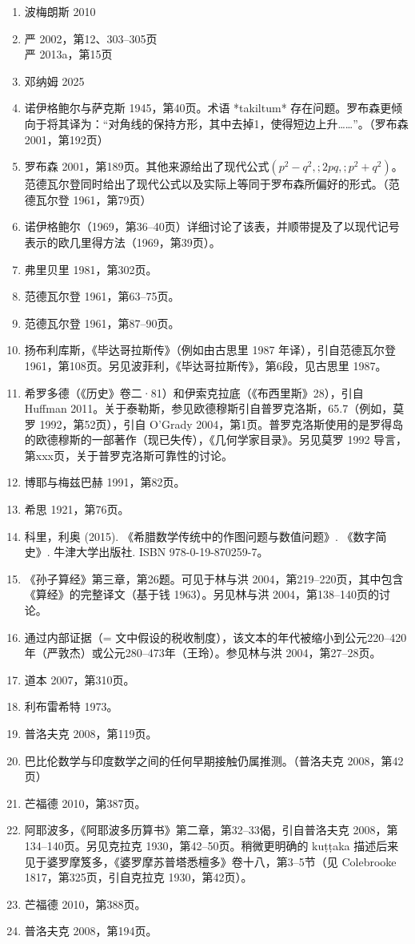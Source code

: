\begin{enumerate}
\item 波梅朗斯 2010
\item 严 2002，第12、303–305页\\
严 2013a，第15页
\item 邓纳姆 2025
\item 诺伊格鲍尔与萨克斯 1945，第40页。术语 *takiltum* 存在问题。罗布森更倾向于将其译为：“对角线的保持方形，其中去掉1，使得短边上升……”。（罗布森 2001，第192页）
\item 罗布森 2001，第189页。其他来源给出了现代公式$(p^{2}-q^{2}, ; 2pq, ; p^{2}+q^{2})$。范德瓦尔登同时给出了现代公式以及实际上等同于罗布森所偏好的形式。（范德瓦尔登 1961，第79页）
\item 诺伊格鲍尔（1969，第36–40页）详细讨论了该表，并顺带提及了以现代记号表示的欧几里得方法（1969，第39页）。
\item 弗里贝里 1981，第302页。
\item 范德瓦尔登 1961，第63–75页。
\item 范德瓦尔登 1961，第87–90页。
\item 扬布利库斯，《毕达哥拉斯传》（例如由古思里 1987 年译），引自范德瓦尔登 1961，第108页。另见波菲利，《毕达哥拉斯传》，第6段，见古思里 1987。
\item 希罗多德（《历史》卷二·81）和伊索克拉底（《布西里斯》28），引自 Huffman 2011。关于泰勒斯，参见欧德穆斯引自普罗克洛斯，65.7（例如，莫罗 1992，第52页），引自 O'Grady 2004，第1页。普罗克洛斯使用的是罗得岛的欧德穆斯的一部著作（现已失传），《几何学家目录》。另见莫罗 1992 导言，第xxx页，关于普罗克洛斯可靠性的讨论。
\item 博耶与梅兹巴赫 1991，第82页。
\item 希思 1921，第76页。
\item 科里，利奥 (2015). 《希腊数学传统中的作图问题与数值问题》. 《数字简史》. 牛津大学出版社. ISBN 978-0-19-870259-7。
\item 《孙子算经》第三章，第26题。可见于林与洪 2004，第219–220页，其中包含《算经》的完整译文（基于钱 1963）。另见林与洪 2004，第138–140页的讨论。
\item 通过内部证据（= 文中假设的税收制度），该文本的年代被缩小到公元220–420年（严敦杰）或公元280–473年（王玲）。参见林与洪 2004，第27–28页。
\item 道本 2007，第310页。
\item 利布雷希特 1973。
\item 普洛夫克 2008，第119页。
\item 巴比伦数学与印度数学之间的任何早期接触仍属推测。（普洛夫克 2008，第42页）
\item 芒福德 2010，第387页。
\item 阿耶波多，《阿耶波多历算书》第二章，第32–33偈，引自普洛夫克 2008，第134–140页。另见克拉克 1930，第42–50页。稍微更明确的 kuṭṭaka 描述后来见于婆罗摩笈多，《婆罗摩苏普塔悉檀多》卷十八，第3–5节（见 Colebrooke 1817，第325页，引自克拉克 1930，第42页）。
\item 芒福德 2010，第388页。
\item 普洛夫克 2008，第194页。


\end{enumerate}

